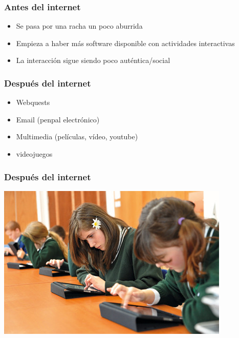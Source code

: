 \documentclass{beamer}
\begin{document}
\begin{frame}
	\frametitle{Antes del internet}

	\begin{itemize}
		\item Se pasa por una racha un poco aburrida 
		\item Empieza a haber más software disponible con actividades interactivas 
		\item La interacción sigue siendo poco auténtica/social
	\end{itemize}
	
\end{frame}

\begin{frame}
	\frametitle{Después del internet}

	\begin{itemize}
		\item Webquests  
		\item Email (penpal electrónico)
		\item Multimedia (películas, vídeo, youtube)
		\item videojuegos 
	\end{itemize}
\end{frame}

\begin{frame}
	\frametitle{Después del internet}

	\begin{center}
		\includegraphics[width=.9\textwidth]{figures/ipad.jpg}
	\end{center}
\end{frame}
\end{document}
